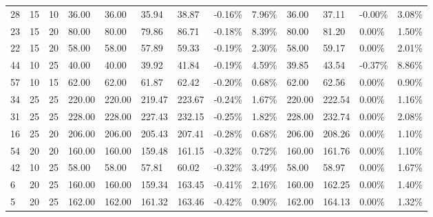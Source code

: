 \begin{longtable}{l|ll|ll|llll|llll}
  28 & 15                         & 10                         & 36.00                     & 36.00         & 35.94  & 38.87  & -0.16\% & 7.96\%  & 36.00  & 37.11  & -0.00\% & 3.08\%  \\
  23 & 15                         & 20                         & 80.00                     & 80.00         & 79.86  & 86.71  & -0.18\% & 8.39\%  & 80.00  & 81.20  & 0.00\%  & 1.50\%  \\
  22 & 15                         & 20                         & 58.00                     & 58.00         & 57.89  & 59.33  & -0.19\% & 2.30\%  & 58.00  & 59.17  & 0.00\%  & 2.01\%  \\
  44 & 10                         & 25                         & 40.00                     & 40.00         & 39.92  & 41.84  & -0.19\% & 4.59\%  & 39.85  & 43.54  & -0.37\% & 8.86\%  \\
  57 & 10                         & 15                         & 62.00                     & 62.00         & 61.87  & 62.42  & -0.20\% & 0.68\%  & 62.00  & 62.56  & 0.00\%  & 0.90\%  \\
  34 & 25                         & 25                         & 220.00                    & 220.00        & 219.47 & 223.67 & -0.24\% & 1.67\%  & 220.00 & 222.54 & 0.00\%  & 1.16\%  \\
  31 & 25                         & 25                         & 228.00                    & 228.00        & 227.43 & 232.15 & -0.25\% & 1.82\%  & 228.00 & 232.74 & 0.00\%  & 2.08\%  \\
  16 & 25                         & 20                         & 206.00                    & 206.00        & 205.43 & 207.41 & -0.28\% & 0.68\%  & 206.00 & 208.26 & 0.00\%  & 1.10\%  \\
  54 & 20                         & 20                         & 160.00                    & 160.00        & 159.48 & 161.15 & -0.32\% & 0.72\%  & 160.00 & 161.76 & 0.00\%  & 1.10\%  \\
  42 & 10                         & 25                         & 58.00                     & 58.00         & 57.81  & 60.02  & -0.32\% & 3.49\%  & 58.00  & 58.97  & 0.00\%  & 1.67\%  \\
  6  & 20                         & 25                         & 160.00                    & 160.00        & 159.34 & 163.45 & -0.41\% & 2.16\%  & 160.00 & 162.25 & 0.00\%  & 1.40\%  \\
  5  & 20                         & 25                         & 162.00                    & 162.00        & 161.32 & 163.46 & -0.42\% & 0.90\%  & 162.00 & 164.13 & 0.00\%  & 1.32\%  \\

\end{longtable}

